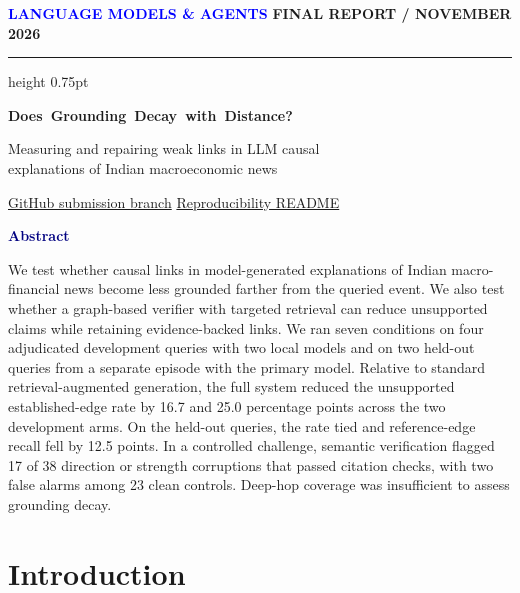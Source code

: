 \documentclass[11pt,a4paper]{article}
\newcommand{\smalllabel}[1]{{\sffamily\bfseries\fontsize{8.5}{11}\selectfont\addfontfeatures{LetterSpace=6}\MakeUppercase{#1}}}
\begin{document}
\color{Ink}\fontsize{11.2}{15.7}\selectfont
\thispagestyle{opening}

\noindent
\textcolor{Blue}{\smalllabel{Language Models \& Agents}}\hfill
\textcolor{Muted}{\smalllabel{Final Report \enspace /  November 2026}}\par
\vspace{5pt}
{\color{Blue}\hrule height 0.75pt}
\vspace{14pt}

{\color{Navy}\bfseries\fontsize{25.5}{31}\selectfont
 \mbox{Does Grounding Decay with Distance?}\par}
{\color{Muted}\fontsize{15.5}{20}\selectfont
 Measuring and repairing weak links in LLM causal\\
 explanations of Indian macroeconomic news\par}
\vspace{6pt}

{\sffamily\fontsize{10}{14}\selectfont
 \href{https://github.com/DeeptiKoranga/lma-grounding-decay/tree/b/episode-confirmation}{GitHub submission branch}
 \quad\textcolor{Rule}{\textbar}\quad
 \href{https://github.com/DeeptiKoranga/lma-grounding-decay/blob/b/episode-confirmation/README.md}{Reproducibility README}\par}
\vspace{5pt}
\noindent\textcolor{Navy}{\bfseries Abstract}\par
\begingroup\fontsize{10.7}{14.2}\selectfont
We test whether causal links in model-generated explanations of Indian
macro-financial news become less grounded farther from the queried event.
We also test whether a graph-based verifier with targeted retrieval can
reduce unsupported claims while retaining evidence-backed links. We ran
seven conditions on four adjudicated development queries with two local
models and on two held-out queries from a separate episode with the
primary model. Relative to standard retrieval-augmented generation, the
full system reduced the unsupported established-edge rate by 16.7 and
25.0 percentage points across the two development arms. On the held-out
queries, the rate tied and reference-edge recall fell by 12.5 points.
In a controlled challenge, semantic verification flagged 17 of 38
direction or strength corruptions that passed citation checks, with two
false alarms among 23 clean controls. Deep-hop coverage was insufficient
to assess grounding decay.
\par\endgroup

\section{Introduction}\label{introduction}
\end{document}

